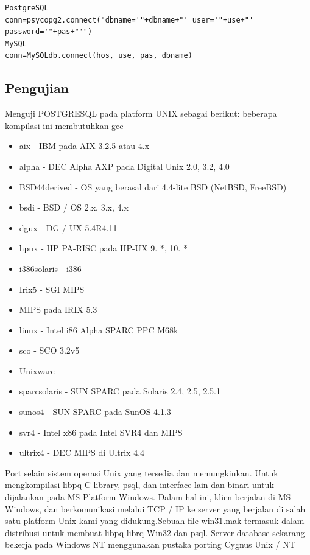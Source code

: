 \begin{verbatim}
PostgreSQL
conn=psycopg2.connect("dbname='"+dbname+"' user='"+use+"' password='"+pas+"'")
MySQL
conn=MySQLdb.connect(hos, use, pas, dbname)
\end{verbatim}

\subsection{Pengujian}
Menguji POSTGRESQL pada platform UNIX sebagai berikut: 
beberapa kompilasi ini membutuhkan gcc
\begin {itemize} 
	\item aix - IBM pada AIX 3.2.5 atau 4.x
	\item alpha - DEC Alpha AXP pada Digital Unix 2.0, 3.2, 4.0
	\item BSD44derived - OS yang berasal dari 4.4-lite BSD (NetBSD, FreeBSD)
	\item bsdi - BSD / OS 2.x, 3.x, 4.x
	\item dgux - DG / UX 5.4R4.11
	\item hpux - HP PA-RISC pada HP-UX 9. *, 10. *
	\item i386solaris - i386
	\item Irix5 - SGI MIPS
	\item MIPS pada IRIX 5.3
	\item linux - Intel i86 Alpha SPARC PPC M68k
	\item sco - SCO 3.2v5
	\item Unixware
	\item sparcsolaris - SUN SPARC pada Solaris 2.4, 2.5, 2.5.1
	\item sunos4 - SUN SPARC pada SunOS 4.1.3
	\item svr4 - Intel x86 pada Intel SVR4 dan MIPS
	\item ultrix4 - DEC MIPS di Ultrix 4.4
\end {itemize}

Port selain sistem operasi Unix yang tersedia dan memungkinkan. 
Untuk mengkompilasi libpq C library, psql, dan interface lain dan binari untuk dijalankan pada MS Platform Windows. Dalam hal ini, klien berjalan di MS Windows, dan berkomunikasi melalui TCP / IP ke server yang berjalan di salah satu platform Unix kami yang didukung.Sebuah file win31.mak termasuk dalam distribusi untuk membuat libpq librq Win32 dan psql. 
Server database sekarang bekerja pada Windows NT menggunakan pustaka porting Cygnus Unix / NT

